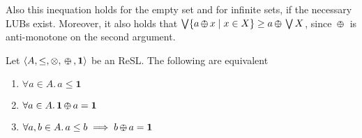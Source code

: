 \documentclass{llncs}
\def\1{{\mathbf 1}}
\newcommand{\shortNoProof}[1]{ }
\def\monid{{\mathbf 0}}
\def\1{{\mathbf 1}}
\def\monop{\otimes}
\def\odiv{\, {\ominus\hspace{-7.7pt} \div} \,}
\def\monid{\mathbf{1}}
\begin{document}
Also this inequation holds for the empty set and for infinite sets, if the necessary LUBs exist.
%
Moreover, it also holds that $\bigvee \{ a \odiv x \mid x \in X \} \geq a \odiv \bigvee X$, since $\odiv$ is anti-monotone on the second argument.

\begin{proposition}\label{reabs}
	Let $\langle A, \leq, \monop, \odiv, \monid \rangle$ be an ReSL. The following are equivalent
	\begin{enumerate}
		\item $\forall a \in A.\, a \leq \1$
		\item $\forall a \in A.\, \1 \odiv a = \1$		
		\item $\forall a, b \in A.\, a \leq b \implies b \odiv a = \1$
	\end{enumerate}	
\end{proposition}

\shortNoProof
{
\begin{proof}
Note that $1$ immediately implies both $2$ and $3$, since by definition $a \leq b$ implies $\1 \leq b \odiv a$
and $\1$ is the top of the partial order.

For the second step, first note that both properties implies that $\1 \odiv a \leq \1$ for all $a \in A$. This is immediate
for $2$. As for $3$, %
consider $b = \bigvee \{\1, a \}$. By Lemma~\ref{distodiv} we have that
$\bigvee \{\1 \odiv a, a \odiv a\} \leq \bigvee \{\1, a \} \odiv a$. 
Hence, $\1 \odiv a \leq \1$ for all $a \in A$, and the result follows.

Finally, note that $\1 \odiv a \leq \1$ for all $a \in A$ implies that $\1 \odiv (\1 \odiv c) \leq \1$ for all $c \in A$, 
and since it always holds
that $c \leq \1 \odiv (\1 \odiv c)$, then $3$ implies $1$.
\qed
\end{proof}
}

\end{document}
